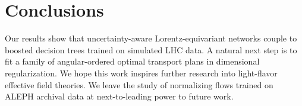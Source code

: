 \section{Conclusions}\label{sec:conclusions}

Our results show that uncertainty-aware Lorentz-equivariant networks
couple to boosted decision trees trained on simulated LHC data. A
natural next step is to fit a family of angular-ordered optimal
transport plans in dimensional regularization. We hope this work
inspires further research into light-flavor effective field theories. We
leave the study of normalizing flows trained on ALEPH archival data at
next-to-leading power to future work.

